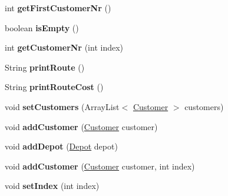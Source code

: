 \begin{DoxyCompactItemize}
\item 
int {\bfseries get\+First\+Customer\+Nr} ()\hypertarget{classsvrptw_1_1_route_a53f93fe709a8a8cf04b1b2cf54dc87e3}{}\label{classsvrptw_1_1_route_a53f93fe709a8a8cf04b1b2cf54dc87e3}

\item 
boolean {\bfseries is\+Empty} ()\hypertarget{classsvrptw_1_1_route_ac84a2987970b22c18618bdd82f6dbb53}{}\label{classsvrptw_1_1_route_ac84a2987970b22c18618bdd82f6dbb53}

\item 
int {\bfseries get\+Customer\+Nr} (int index)\hypertarget{classsvrptw_1_1_route_a1a7563fa2f372b1cab0a2e89c3d03840}{}\label{classsvrptw_1_1_route_a1a7563fa2f372b1cab0a2e89c3d03840}

\item 
String {\bfseries print\+Route} ()\hypertarget{classsvrptw_1_1_route_ac8180aa6672c795b882831aa26db6fed}{}\label{classsvrptw_1_1_route_ac8180aa6672c795b882831aa26db6fed}

\item 
String {\bfseries print\+Route\+Cost} ()\hypertarget{classsvrptw_1_1_route_a56bd646c25a144e4bf34cee6271cebab}{}\label{classsvrptw_1_1_route_a56bd646c25a144e4bf34cee6271cebab}

\item 
void {\bfseries set\+Customers} (Array\+List$<$ \hyperlink{classsvrptw_1_1_customer}{Customer} $>$ customers)\hypertarget{classsvrptw_1_1_route_a459a6236a1d3a25f4984c8069d562ed9}{}\label{classsvrptw_1_1_route_a459a6236a1d3a25f4984c8069d562ed9}

\item 
void {\bfseries add\+Customer} (\hyperlink{classsvrptw_1_1_customer}{Customer} customer)\hypertarget{classsvrptw_1_1_route_a9abfda439c4034bd3de13a21022abcef}{}\label{classsvrptw_1_1_route_a9abfda439c4034bd3de13a21022abcef}

\item 
void {\bfseries add\+Depot} (\hyperlink{classsvrptw_1_1_depot}{Depot} depot)\hypertarget{classsvrptw_1_1_route_a0bd5b2580f049dededd8e3bddadae8dc}{}\label{classsvrptw_1_1_route_a0bd5b2580f049dededd8e3bddadae8dc}

\item 
void {\bfseries add\+Customer} (\hyperlink{classsvrptw_1_1_customer}{Customer} customer, int index)\hypertarget{classsvrptw_1_1_route_ae5ee349c668bf774938a7deaa5ae056f}{}\label{classsvrptw_1_1_route_ae5ee349c668bf774938a7deaa5ae056f}

\item 
void {\bfseries set\+Index} (int index)\hypertarget{classsvrptw_1_1_route_afb2bca49f42b1ef0f4feccb95bfe07cd}{}\label{classsvrptw_1_1_route_afb2bca49f42b1ef0f4feccb95bfe07cd}


\end{DoxyCompactItemize}
